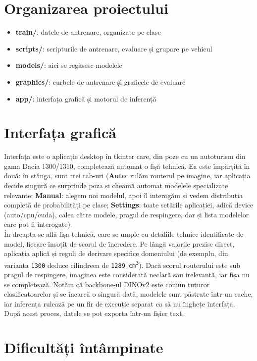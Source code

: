 \documentclass[12pt, a4paper, openany]{book}
\begin{document}
\section{Organizarea proiectului}
\begin{itemize}
\item \textbf{train/}: datele de antrenare, organizate pe clase
\item \textbf{scripts/}: scripturile de antrenare, evaluare și grupare pe vehicul
\item \textbf{models/}: aici se regăsesc modelele
\item \textbf{graphics/}: curbele de antrenare și graficele de evaluare
\item \textbf{app/}: interfața grafică și motorul de inferență
\end{itemize}
\section{Interfața grafică}
Interfața este o aplicație desktop în tkinter care, din poze cu un autoturism din gama Dacia 1300/1310, completează automat o fișă tehnică. Ea este împărțită în două: în stânga, sunt trei tab-uri (\textbf{Auto}: rulăm routerul pe imagine, iar aplicația decide singură ce surprinde poza și cheamă automat modelele specializate relevante; \textbf{Manual}: alegem noi modelul, apoi îl interogăm și vedem distribuția completă de probabilități pe clase; \textbf{Settings}: toate setările aplicației, adică device (auto/cpu/cuda), calea către modele, pragul de respingere, dar și lista modelelor care pot fi interogate).
\\ \indent În dreapta se află fișa tehnică, care se umple cu detaliile tehnice identificate de model, fiecare însoțit de scorul de încredere. Pe lângă valorile prezise direct, aplicația aplică și reguli de derivare specifice domeniului (de exemplu, din varianta \texttt{1300} deduce cilindreea de \texttt{1289 cm\textsuperscript{3}}). Dacă scorul routerului este sub pragul de respingere, imaginea este considerată neclară sau irelevantă, iar fișa nu se completează. Notăm că backbone-ul DINOv2 este comun tuturor clasificatoarelor și se încarcă o singură dată, modelele sunt păstrate într-un cache, iar inferența rulează pe un fir de execuție separat ca să nu înghețe interfața. După acest proces, datele se pot exporta într-un fișier text.

\section{Dificultăți întâmpinate}
\end{document}
